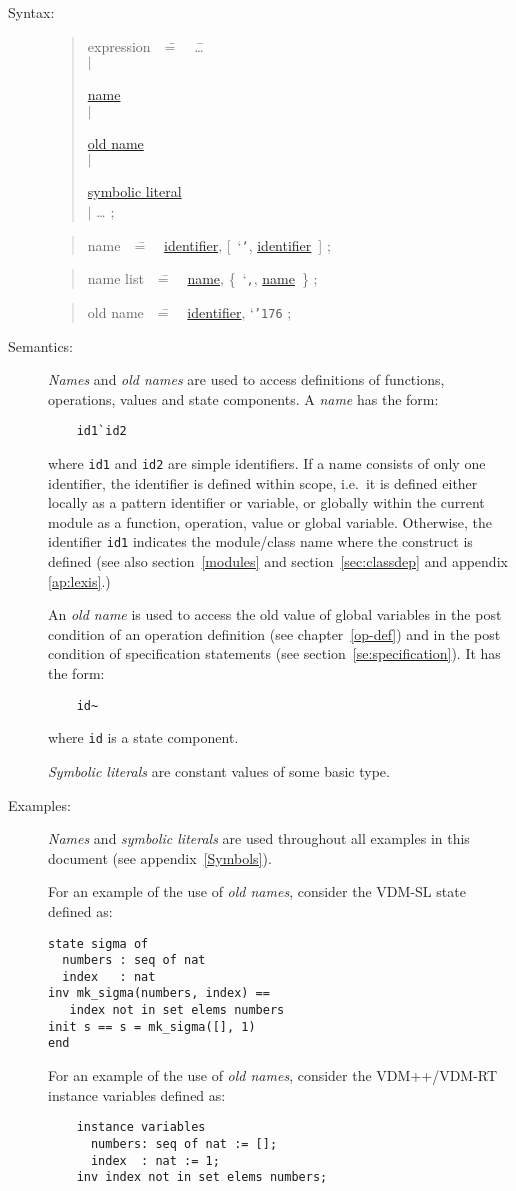 \documentclass{overturerepchap}
\newcommand{\Lit}[1]{`{\tt #1}\Quote}
\newcommand{\Rule}[2]{
  \begin{quote}\begin{tabbing}
    #1\index{#1}\ \ \= = \ \ \= #2  ; %

  \end{tabbing}\end{quote}
  }
\newcommand{\Ruleref}[1]{
  \hyperlink{rule:#1}{#1}}
\newcommand{\SeqPt}[1]{\{\ #1\ \}}
\newcommand{\dsep}{\\ \> $|$ \>}
\newcommand{\OptPt}[1]{[\ #1\ ]}
\begin{document}
{\begin{description}
\item[Syntax:]
  \Rule{expression}{    \ldots \dsep
    \Ruleref{name} \dsep
    \Ruleref{old name} \dsep
    \Ruleref{symbolic literal} \dsep
    \ldots
    }

  \Rule{name}{
    \Ruleref{identifier}, \OptPt{\Lit{`}, \Ruleref{identifier}}
    }

  \Rule{name list}{
    \Ruleref{name}, \SeqPt{\Lit{,}, \Ruleref{name}}
    }

  \Rule{old name}{
    \Ruleref{identifier}, \Lit{\char'176}
    }

\item[Semantics:] {\it Names\/} and {\it old names\/} are used to access
  definitions of functions, operations, values and state components. A {\it
    name\/} has the form:
  \begin{lstlisting}
    id1`id2
  \end{lstlisting}
  where {\tt id1} and {\tt id2} are simple identifiers. If a name consists
  of only one identifier, the identifier is defined within scope, i.e.\ it
  is defined either locally as a pattern identifier or variable,
  or globally within the current module as a function, operation,
  value or global variable.
  Otherwise, the identifier {\tt id1} indicates the
module/class name
where the
  construct is defined (see also
  section~\ref{modules} and
  section~\ref{sec:classdep}
and appendix \ref{ap:lexis}.)

  An {\it old name\/} is used to access the old value of global
  variables in the post condition of an operation definition (see
  chapter~\ref{op-def}) and in the post condition of specification
  statements (see section~\ref{se:specification}).  It has the form:

  \begin{lstlisting}
    id~
  \end{lstlisting}
  where {\tt id} is a state component.

  {\it Symbolic literals\/} are constant values of some basic type.

\item[Examples:] {\it Names} and {\it symbolic literals\/} are used
  throughout all examples in this document (see appendix~\ref{Symbols}).

  For an example of the use of {\it old names}, consider the VDM-SL
  state defined as:
  \begin{lstlisting}
state sigma of
  numbers : seq of nat
  index   : nat
inv mk_sigma(numbers, index) ==
   index not in set elems numbers
init s == s = mk_sigma([], 1)
end
  \end{lstlisting}
  For an example of the use of {\it old names}, consider the
  VDM++/VDM-RT instance variables defined as:
  \begin{lstlisting}
    instance variables
      numbers: seq of nat := [];
      index  : nat := 1;
    inv index not in set elems numbers;
  \end{lstlisting}


\end{description}}
\end{document}
